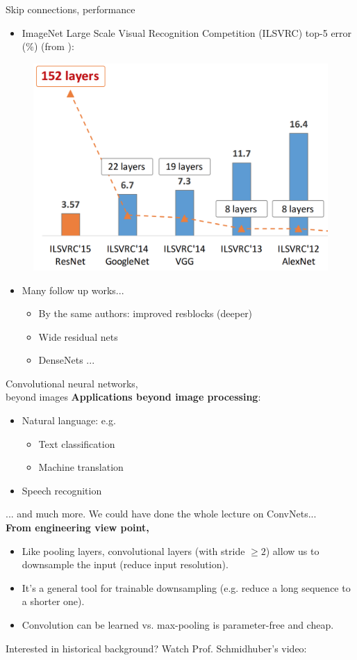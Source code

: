 \begin{frame}{Skip connections, performance}
\begin{itemize}
\item 
ImageNet Large Scale Visual Recognition Competition (ILSVRC) top-5 error (\%) (from ):
\end{itemize}
\begin{figure}
\centering
\includegraphics[width=.5\linewidth]{./figures/image_net.png}
\end{figure}
\begin{itemize}
\item Many follow up works... 
\begin{itemize}
\item By the same authors: improved resblocks  (deeper)
\item Wide residual nets 
\item DenseNets ...
\end{itemize}
\end{itemize}
\end{frame}

\begin{frame}{Convolutional neural networks,\\
beyond images}
\textbf{Applications beyond image processing}:
\begin{itemize}
\item Natural language: e.g.
\begin{itemize}
\item Text classification 
\item Machine translation 
\end{itemize}
\item Speech recognition 
\end{itemize}\vsp
... and much more. We could have done the whole lecture on ConvNets...\\
\vsp
\textbf{From engineering view point,}
\begin{itemize}
\item Like pooling layers, convolutional layers (with stride $\geq 2$) allow us to downsample the input (reduce input resolution).
\item  It's a general tool for trainable downsampling (e.g.
reduce a long sequence to a shorter one).
\item Convolution can be learned vs. max-pooling is parameter-free and cheap.
\end{itemize}
Interested in historical background? Watch Prof. Schmidhuber's video: 
\end{frame}

